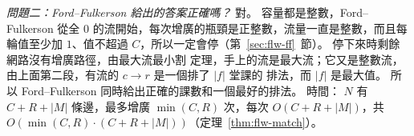 \emph{問題二：Ford--Fulkerson 給出的答案正確嗎？} 對。 容量都是整數，Ford--Fulkerson 從全
$0$ 的流開始，每次增廣的瓶頸是正整數，流量一直是整數，而且每輪值至少加 $1$、值不超過
$C$，所以一定會停（第~\ref{sec:flw-ff}~節）。 停下來時剩餘網路沒有增廣路徑，由最大流最小割
定理，手上的流是最大流；它又是整數流，由上面第二段，有流的 $c \to r$ 是一個排了 $|f|$ 堂課的
排法，而 $|f|$ 是最大值。 所以 Ford--Fulkerson 同時給出正確的課數和一個最好的排法。 時間：
$N$ 有 $C + R + |M|$ 條邊，最多增廣 $\min(C, R)$ 次，每次 $O(C + R + |M|)$，共
$O(\min(C, R) \cdot (C + R + |M|))$（定理~\ref{thm:flw-match}）。
